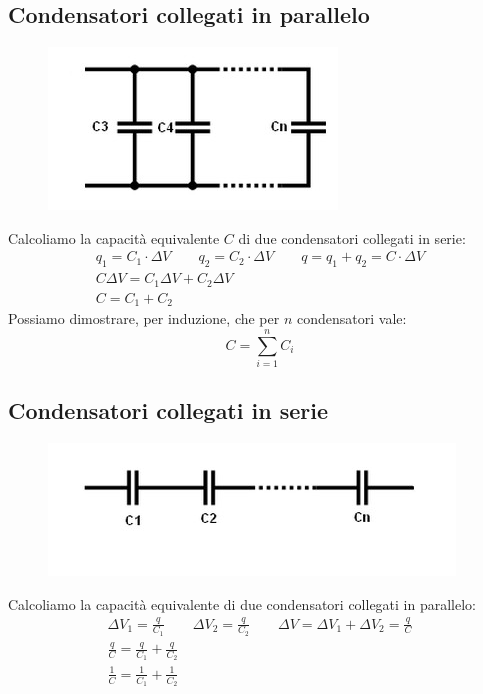 \subsection{Condensatori collegati in parallelo}
\begin{figure}
	\centering
    \includegraphics[scale = 0.7]{Pictures/condensatori-parallelo}
\end{figure}
Calcoliamo la capacità equivalente $C$ di due condensatori collegati in serie:
\begin{displaymath}\begin{aligned}
	q_1 = C_1 \cdot \Delta V \qquad q_2 = C_2 \cdot \Delta V \qquad q = q_1 + q_2 = C \cdot \Delta V\\
    C \Delta V = C_1 \Delta V + C_2 \Delta V\\
    C = C_1 + C_2
\end{aligned}\end{displaymath}
Possiamo dimostrare, per induzione, che per $n$ condensatori vale:
\begin{displaymath}
	C = \sum_{i=1}^n C_i
\end{displaymath}

\subsection{Condensatori collegati in serie}
\begin{figure}[h!]
	\centering
    \includegraphics[scale = 0.8]{Pictures/condensatori-serie}
\end{figure}
Calcoliamo la capacità equivalente di due condensatori collegati in parallelo:
\begin{displaymath}\begin{aligned}
	\Delta V_1 = \frac{q}{C_1} \qquad \Delta V_2 = \frac{q}{C_2} \qquad
    \Delta V = \Delta V_1 + \Delta V_2 = \frac{q}{C}\\
    \frac{q}{C} = \frac{q}{C_1} + \frac{q}{C_2}\\
    \frac{1}{C} = \frac{1}{C_1} + \frac{1}{C_2}
\end{aligned}\end{displaymath}

